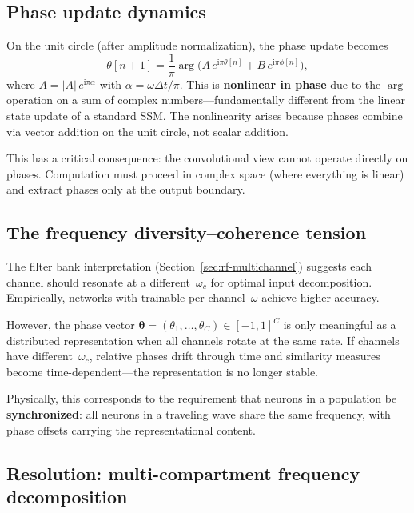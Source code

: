 \documentclass[11pt]{article}
\newcommand{\im}{\mathrm{i}}
\newcommand{\dt}{\Delta t}
\theoremstyle{definition}
\begin{document}
\subsection{Phase update dynamics}\label{sec:phase-dynamics}

On the unit circle (after amplitude normalization), the phase update
becomes
\begin{equation}\label{eq:phase-update}
  \theta[n+1]
    = \frac{1}{\pi}\arg\!\bigl(
        A\,e^{\im\pi\theta[n]} + B\,e^{\im\pi\phi[n]}
      \bigr),
\end{equation}
where $A = |A|\,e^{\im\pi\alpha}$ with $\alpha = \omega\dt/\pi$.
This is \textbf{nonlinear in phase} due to the $\arg$ operation on a sum
of complex numbers---fundamentally different from the linear state update
of a standard SSM. The nonlinearity arises because phases combine via
vector addition on the unit circle, not scalar addition.

This has a critical consequence: the convolutional view cannot operate
directly on phases. Computation must proceed in complex space (where
everything is linear) and extract phases only at the output boundary.

\subsection{The frequency diversity--coherence tension}\label{sec:tension}

The filter bank interpretation (Section~\ref{sec:rf-multichannel})
suggests each channel should resonate at a different~$\omega_c$ for
optimal input decomposition. Empirically, networks with trainable
per-channel~$\omega$ achieve higher accuracy.

However, the phase vector
$\bm\theta = (\theta_1,\dots,\theta_C) \in [-1,1]^C$ is only meaningful
as a distributed representation when all channels rotate at the same
rate. If channels have different~$\omega_c$, relative phases drift
through time and similarity measures become time-dependent---the
representation is no longer stable.

Physically, this corresponds to the requirement that neurons in a
population be \textbf{synchronized}: all neurons in a traveling wave share
the same frequency, with phase offsets carrying the representational
content.

\subsection{Resolution: multi-compartment frequency decomposition}
\label{sec:phasorstft}
\end{document}
